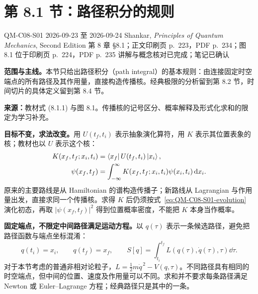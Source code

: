 \section{第 8.1 节：路径积分的规则}
\label{section:QM-C08-S01}
\studymeta
  {QM-C08-S01}
  {2026-09-23 至 2026-09-24}
  {Shankar, \textit{Principles of Quantum Mechanics}, Second Edition}
  {第 8 章 \S 8.1；正文印刷页 p.~223，PDF p.~234；图 8.1 位于印刷页 p.~224，PDF p.~235}
  {讲解与概念核对已完成；笔记已确认}

\textbf{范围与主线。}本节只给出路径积分（path integral）的基本规则：由连接固定时空端点的所有路径及其作用量，直接构造传播核。经典极限的分析留到第 8.2 节，时间切片的具体定义留到第 8.4 节。

\textbf{来源：}教材式 (8.1.1) 与图 8.1。传播核的记号区分、概率解释及形式化求和的限定为学习补充。

\textbf{目标不变，求法改变。}用 $U(t_f,t_i)$ 表示抽象演化算符，用 $K$ 表示其位置表象的核；教材也以 $U$ 表示这个核：
\begin{align}
  K(x_f,t_f;x_i,t_i)&=\left\langle x_f\right|U(t_f,t_i)\left|x_i\right\rangle,\\
  \psi(x_f,t_f)&=\int_{-\infty}^{\infty}
     K(x_f,t_f;x_i,t_i)\psi(x_i,t_i)\mathop{}\!\mathrm{d} x_i.
  \label{eq:QM-C08-S01-evolution}
\end{align}
原来的主要路线是从 Hamiltonian 的谱构造传播子；新路线从 Lagrangian 与作用量出发，直接求同一个传播核。求得 $K$ 后仍须按式~\eqref{eq:QM-C08-S01-evolution} 演化初态，再取 $|\psi(x_f,t_f)|^2$ 得到位置概率密度，不能把 $K$ 本身当作概率。

\textbf{固定端点，不限定中间路径满足运动方程。}以 $q(\tau)$ 表示一条候选路径，避免把路径函数与端点坐标混淆：
\begin{equation}
  q(t_i)=x_i,\qquad q(t_f)=x_f,\qquad
  S[q]=\int_{t_i}^{t_f}L(q(\tau),\dot q(\tau),\tau)\dd\tau.
\end{equation}
对于本节考虑的普通非相对论粒子，$L=\tfrac12m\dot q^{\,2}-V(q,\tau)$。不同路径具有相同的时空端点，但中间的位置、速度及作用量可以不同。求和并不要求每条路径满足 Newton 或 Euler--Lagrange 方程；经典路径只是其中的一条。

